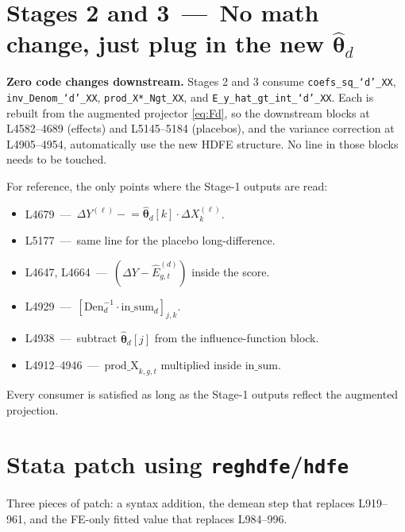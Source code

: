 \documentclass[11pt]{article}
\newcommand{\code}[1]{\texttt{\small #1}}
\newcommand{\1}{\mathbb{1}}
\newcommand{\thetad}{\widehat{\bm{\theta}}_d}
\begin{document}
\section[Stages 2 and 3 -- No math change, just plug in the new theta]{Stages 2 and 3 \,---\, No math change, just plug in the new $\thetad$}

\begin{tcolorbox}[colback=codebg, colframe=ok, boxrule=0.6pt, arc=1pt]
\textbf{Zero code changes downstream.} Stages 2 and 3 consume
\code{coefs\_sq\_`d'\_XX}, \code{inv\_Denom\_`d'\_XX},
\code{prod\_X*\_Ngt\_XX}, and \code{E\_y\_hat\_gt\_int\_`d'\_XX}.\;
Each is rebuilt from the augmented projector \eqref{eq:Fd}, so the
downstream blocks at L4582--4689 (effects) and L5145--5184 (placebos), and
the variance correction at L4905--4954, automatically use the new HDFE
structure. No line in those blocks needs to be touched.
\end{tcolorbox}

\noindent
For reference, the only points where the Stage-1 outputs are read:
\begin{itemize}[leftmargin=*, itemsep=2pt]
\item L4679 \,---\, $\Delta Y^{(\ell)} \mathrel{-}{=} \thetad[k]\cdot \Delta X^{(\ell)}_k$.
\item L5177 \,---\, same line for the placebo long-difference.
\item L4647, L4664 \,---\, $(\Delta Y - \widehat{E}^{(d)}_{g,t})$ inside the score.
\item L4929 \,---\, $[\mathrm{Den}_d^{-1}\cdot \mathrm{in\_sum}_d]_{j,k}$.
\item L4938 \,---\, subtract $\thetad[j]$ from the influence-function block.
\item L4912--4946 \,---\, $\mathrm{prod\_X}_{k,g,t}$ multiplied inside $\mathrm{in\_sum}$.
\end{itemize}
Every consumer is satisfied as long as the Stage-1 outputs reflect the
augmented projection.

\section{Stata patch using \texttt{reghdfe}/\texttt{hdfe}}

Three pieces of patch: a syntax addition, the demean step that replaces
L919--961, and the FE-only fitted value that replaces L984--996.
\end{document}
